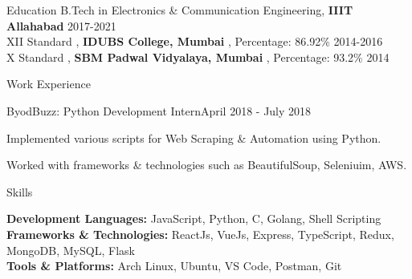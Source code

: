 \documentclass{resume} %
\begin{document}
  


\begin{rSection}{Education}
{ B.Tech in Electronics \& Communication Engineering, \textbf{IIIT Allahabad} } \hfill {2017-2021}
\\
{ XII Standard  , \textbf{IDUBS College, Mumbai} , Percentage: 86.92\%} \hfill {2014-2016}
\\
{ X Standard  , \textbf{SBM Padwal Vidyalaya, Mumbai} , Percentage: 93.2\%}  \hfill {2014}
\end{rSection} 


\begin{rSection}{ Work Experience } \itemsep -1pt        

\begin{rSubsection}{ByodBuzz: Python Development Intern}{April 2018 - July 2018}{}    

\vspace{-3pt}

\item Implemented various scripts for Web Scraping \& Automation using Python.
\item Worked with frameworks \& technologies such as BeautifulSoup, Seleniuim, AWS.
\end{rSubsection} 

\vspace{-4pt}

 
\end{rSection}


\begin{rSection}{Skills} \itemsep -3pt  

{\textbf{Development Languages:} JavaScript, Python, C, Golang, Shell Scripting }  
\\
{\textbf{Frameworks \& Technologies:} ReactJs, VueJs, Express, TypeScript, Redux, MongoDB, MySQL, Flask }
\\
{\textbf{Tools \& Platforms:} Arch Linux, Ubuntu, VS Code, Postman, Git }
\end{rSection}  

\end{document}
